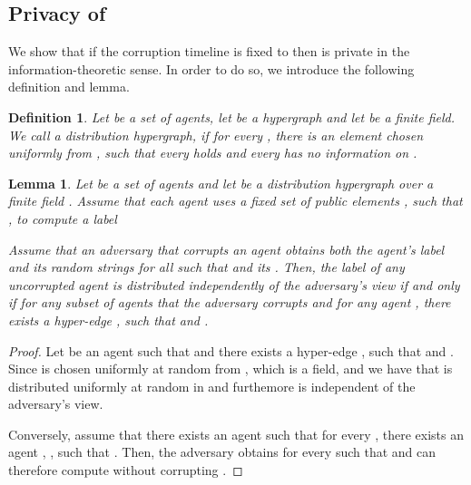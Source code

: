 \documentclass[letterpaper,11pt]{article}
\newtheorem{definition}{Definition}
\newtheorem{lemma}[theorem]{Lemma}
\begin{document}
\subsection{Privacy of }
We show that if the corruption timeline is fixed to  then  is private in the information-theoretic sense. In order to do so, we introduce the following definition and lemma.
\begin{definition}
Let  be a set of agents, let  be a hypergraph and let  be a finite field. We call  a {\em distribution hypergraph}, if for every , there is an element  chosen uniformly from , such that every  holds  and every  has no information on .
\end{definition}

\begin{lemma} 
\label{prop-privacy}
Let  be a set of agents and let  be a distribution hypergraph over a finite field . Assume that each agent  uses a fixed set of public elements , such that ,  to compute a label 

Assume that an adversary that corrupts an agent  obtains both the agent's label  and its random strings  for all  such that  and its . Then, the label of any uncorrupted agent  is distributed independently of the adversary's view if and only if for any subset of agents  that the adversary corrupts and for any agent , there exists a hyper-edge , such that  and . 
\end{lemma}

\begin {proof}
Let  be an agent such that  and there exists a hyper-edge , such that  and . Since  is chosen uniformly at random from , which is a field, and  we have that  is distributed uniformly at random in  and furthemore  is independent of the adversary's view.  

Conversely, assume that there exists an agent  such that for every , there exists an agent , ,  such that . Then, the adversary obtains  for every  such that  and can therefore compute  without corrupting .
\end {proof} 
\end{document}
